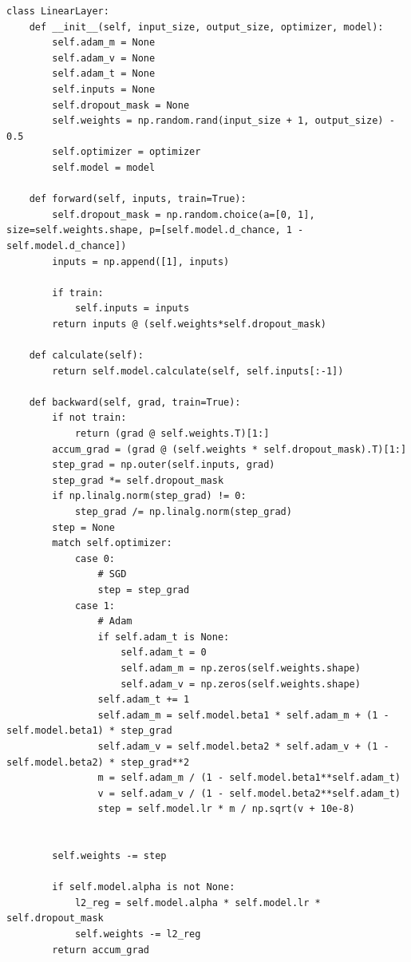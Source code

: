 \documentclass[a4paper, 14pt]{extarticle}
\begin{document}
\begin{lstlisting}[language={},caption={Класс линейного слоя (с реализацией дропаута и L2-регуляризации)},label={lst:code3}, breaklines=true]
class LinearLayer:
    def __init__(self, input_size, output_size, optimizer, model):
        self.adam_m = None
        self.adam_v = None
        self.adam_t = None
        self.inputs = None
        self.dropout_mask = None
        self.weights = np.random.rand(input_size + 1, output_size) - 0.5
        self.optimizer = optimizer
        self.model = model

    def forward(self, inputs, train=True):
        self.dropout_mask = np.random.choice(a=[0, 1], size=self.weights.shape, p=[self.model.d_chance, 1 - self.model.d_chance])
        inputs = np.append([1], inputs)

        if train:
            self.inputs = inputs
        return inputs @ (self.weights*self.dropout_mask)

    def calculate(self):
        return self.model.calculate(self, self.inputs[:-1])

    def backward(self, grad, train=True):
        if not train:
            return (grad @ self.weights.T)[1:]
        accum_grad = (grad @ (self.weights * self.dropout_mask).T)[1:]
        step_grad = np.outer(self.inputs, grad)
        step_grad *= self.dropout_mask
        if np.linalg.norm(step_grad) != 0:
            step_grad /= np.linalg.norm(step_grad)
        step = None
        match self.optimizer:
            case 0:
                # SGD
                step = step_grad
            case 1:
                # Adam
                if self.adam_t is None:
                    self.adam_t = 0
                    self.adam_m = np.zeros(self.weights.shape)
                    self.adam_v = np.zeros(self.weights.shape)
                self.adam_t += 1
                self.adam_m = self.model.beta1 * self.adam_m + (1 - self.model.beta1) * step_grad
                self.adam_v = self.model.beta2 * self.adam_v + (1 - self.model.beta2) * step_grad**2
                m = self.adam_m / (1 - self.model.beta1**self.adam_t)
                v = self.adam_v / (1 - self.model.beta2**self.adam_t)
                step = self.model.lr * m / np.sqrt(v + 10e-8)


        self.weights -= step

        if self.model.alpha is not None:
            l2_reg = self.model.alpha * self.model.lr * self.dropout_mask
            self.weights -= l2_reg
        return accum_grad

\end{lstlisting}
\end{document}

